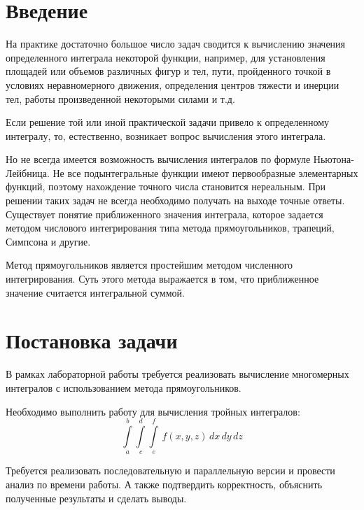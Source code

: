 \documentclass{report}
\begin{document}
\setcounter{page}{2}

\tableofcontents
\newpage

\section*{Введение}
На практике достаточно большое число задач сводится к вычислению значения
определенного интеграла некоторой функции, например, для установления площадей или объемов различных фигур и тел, пути, пройденного точкой в условиях неравномерного движения, определения центров тяжести и инерции тел, работы произведенной некоторыми силами и т.д.
\par Если решение той или иной практической задачи привело к определенному интегралу, то, естественно, возникает вопрос вычисления этого интеграла. 
\par Но не всегда имеется возможность вычисления интегралов по формуле Ньютона-Лейбница. Не все подынтегральные функции имеют первообразные элементарных функций, поэтому нахождение точного числа становится нереальным. При решении таких задач не всегда необходимо получать на выходе точные ответы. Существует понятие приближенного значения интеграла, которое задается методом числового интегрирования типа метода прямоугольников, трапеций, Симпсона и другие.
\par Метод прямоугольников является простейшим методом численного интегрирования. Суть этого метода выражается в том, что приближенное значение считается интегральной суммой.

\newpage

\section*{Постановка задачи}
В рамках лабораторной работы требуется реализовать вычисление многомерных интегралов с использованием метода прямоугольников. 
\par Необходимо выполнить работу для вычисления тройных интегралов:
$$\int\limits_a^b 
\int\limits_c^d 
\int\limits_e^f \,f(x,y,z)\,dx\,dy\,dz
$$
\par Требуется реализовать последовательную и параллельную версии и провести анализ по времени работы. А также подтвердить корректность, объяснить полученные результаты и сделать выводы. 

\newpage
\end{document}
